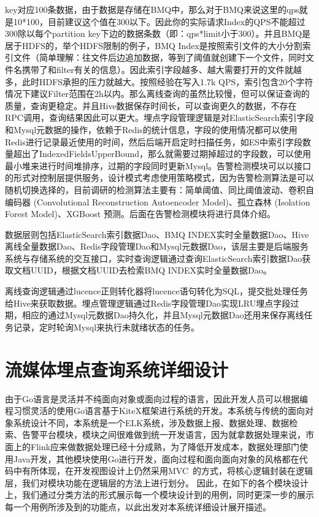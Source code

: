 key对应100条数据，由于数据是存储在BMQ中，那么对于BMQ来说这里的qps就是10*100，目前建议这个值在300以下。因此你的实际请求Index的QPS不能超过300除以每个partition key下边的数据条数（即：qps*limit小于300）。并且BMQ是居于HDFS的，举个HDFS限制的例子，BMQ Index是按照索引文件的大小分割索引文件（简单理解：往文件后边追加数据，等到了阈值就创建下一个文件，同时文件名携带了和filter有关的信息）。因此索引字段越多、越大需要打开的文件就越多，此时HDFS承担的压力就越大。按照经验在写入1.7k QPS，索引包含20个字符情况下建议Filter范围在2h以内。那么离线查询的虽然比较慢，但可以保证查询的质量，查询更稳定。并且Hive数据保存时间长，可以查询更久的数据，不存在RPC调用，查询结果因此可以更大。埋点字段管理逻辑是对ElasticSearch索引字段和Mysql元数据的操作，依赖于Redis的统计信息，字段的使用情况都可以使用Redis进行记录最近使用的时间，然后后端开启定时扫描任务，如ES中索引字段数量超出了IndexedFieldsUpperBound，那么就需要过期掉超过的字段数，可以使用最小堆来进行时间堆排序，过期的字段同时更新Mysql。告警检测模块可以以接口的形式对控制层提供服务，设计模式考虑使用策略模式，因为告警检测算法是可以随机切换选择的，目前调研的检测算法主要有：简单阈值、同比阈值波动、卷积自编码器 (Convolutional Reconstruction Autoencoder Model)、孤立森林 (Isolation Forest Model)、XGBoost 预测。后面在告警检测模块将进行具体介绍。

数据层则包括ElasticSearch索引数据Dao、BMQ INDEX实时全量数据Dao、Hive离线全量数据Dao、Redis字段管理Dao和Mysql元数据Dao，该层主要是后端服务系统与存储系统的交互接口，实时查询逻辑通过查询ElasticSearch索引数据Dao获取文档UUID，根据文档UUID去检索BMQ INDEX实时全量数据Dao。

离线查询逻辑通过lucence正则转化器将lucence语句转化为SQL，提交批处理任务给Hive来获取数据。埋点管理逻辑通过Redis字段管理Dao实现LRU埋点字段过期，相应的通过Mysql元数据Dao持久化，并且Mysql元数据Dao还用来保存离线任务记录，定时轮询Mysql来执行未就绪状态的任务。

\section{流媒体埋点查询系统详细设计}
由于Go语言是灵活并不纯面向对象或面向过程的语言，因此开发人员可以根据编程习惯灵活的使用Go语言基于KiteX框架进行系统的开发。本系统与传统的面向对象系统设计不同，本系统是一个ELK系统，涉及数据上报、数据处理、数据检索、告警平台模块，模块之间很难做到统一开发语言，因为就拿数据处理来说，市面上的Flink应来做数据处理已经十分成熟，为了降低开发成本，数据处理部门使用Java开发，其他模块使用Go进行开发，面向过程和面向面向对象的风格都在代码中有所体现，在开发视图设计上仍然采用MVC~\cite{pop2014designing}的方式，将核心逻辑封装在逻辑层，我们对模块功能在逻辑层的方法上进行划分。
因此，在如下的各个模块设计上，我们通过分类方法的形式展示每一个模块设计到的用例，同时更深一步的展示每一个用例所涉及到的功能点，以此出发对本系统详细设计展开描述。

